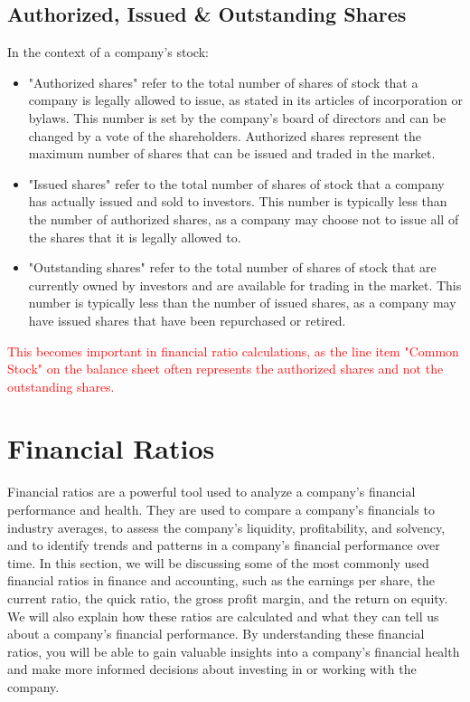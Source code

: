 \documentclass{article}
\begin{document}
\subsection{Authorized, Issued \& Outstanding Shares}
In the context of a company's stock:
\begin{itemize}
\item "Authorized shares" refer to the total number of shares of stock that a company is legally allowed to issue, as stated in its articles of incorporation or bylaws. This number is set by the company's board of directors and can be changed by a vote of the shareholders. Authorized shares represent the maximum number of shares that can be issued and traded in the market.
\item "Issued shares" refer to the total number of shares of stock that a company has actually issued and sold to investors. This number is typically less than the number of authorized shares, as a company may choose not to issue all of the shares that it is legally allowed to.
\item "Outstanding shares" refer to the total number of shares of stock that are currently owned by investors and are available for trading in the market. This number is typically less than the number of issued shares, as a company may have issued shares that have been repurchased or retired.
\end{itemize}

\textcolor{red}{This becomes important in financial ratio calculations, as the line item "Common Stock" on the balance sheet often represents the authorized shares and not the outstanding shares.}




\section{Financial Ratios}
Financial ratios are a powerful tool used to analyze a company's financial performance and health. They are used to compare a company's financials to industry averages, to assess the company's liquidity, profitability, and solvency, and to identify trends and patterns in a company's financial performance over time. In this section, we will be discussing some of the most commonly used financial ratios in finance and accounting, such as the earnings per share, the current ratio, the quick ratio, the gross profit margin, and the return on equity. We will also explain how these ratios are calculated and what they can tell us about a company's financial performance. By understanding these financial ratios, you will be able to gain valuable insights into a company's financial health and make more informed decisions about investing in or working with the company.
\end{document}
